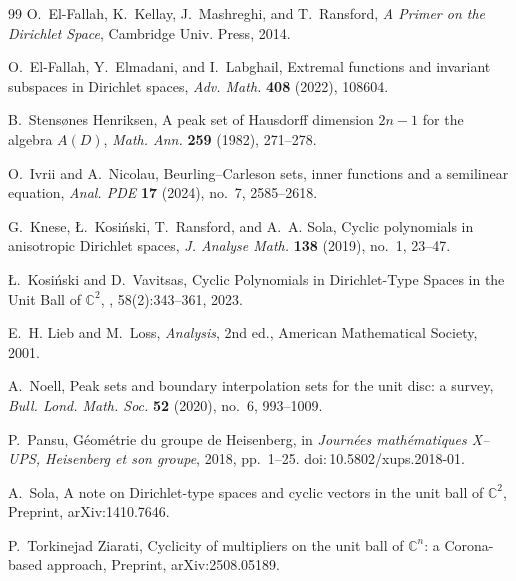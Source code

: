 \documentclass[a4paper,12pt]{amsart}
\theoremstyle{definition}
\theoremstyle{remark}
\begin{document}
\begin{thebibliography}{99}
O.~El-Fallah, K.~Kellay, J.~Mashreghi, and T.~Ransford,
\newblock \emph{A Primer on the {Dirichlet} Space},
\newblock Cambridge Univ. Press, 2014.

O.~El-Fallah, Y.~Elmadani, and I.~Labghail,
\newblock Extremal functions and invariant subspaces in {Dirichlet} spaces,
\newblock \emph{Adv. Math.} \textbf{408} (2022), 108604.

B.~Stensønes Henriksen,
\newblock A peak set of {H}ausdorff dimension $2n-1$ for the algebra $A(D)$,
\newblock \emph{Math. Ann.} \textbf{259} (1982), 271--278.

O.~Ivrii and A.~Nicolau,
\newblock Beurling--{C}arleson sets, inner functions and a semilinear equation,
\newblock \emph{Anal. PDE} \textbf{17} (2024), no.~7, 2585--2618.

G.~Knese, Ł.~Kosiński, T.~Ransford, and A.~A. Sola,
\newblock Cyclic polynomials in anisotropic {Dirichlet} spaces,
\newblock \emph{J. Analyse Math.} \textbf{138} (2019), no.~1, 23--47.

Ł.~Kosiński and D.~Vavitsas,
\newblock Cyclic Polynomials in Dirichlet-Type Spaces in the Unit Ball of \(\mathbb{C}^2\),
, 58(2):343–361, 2023.



E.~H. Lieb and M.~Loss,
\emph{Analysis},
2nd ed.,
American Mathematical Society, 2001.


A.~Noell,
\newblock Peak sets and boundary interpolation sets for the unit disc: a survey,
\newblock \emph{Bull. Lond. Math. Soc.} \textbf{52} (2020), no.~6, 993--1009.

P.~Pansu,
\newblock Géométrie du groupe de Heisenberg,
\newblock in \emph{Journées mathématiques X--UPS, Heisenberg et son groupe},
  2018, pp.~1--25.
\newblock doi:\,10.5802/xups.2018-01.


A.~Sola,
\newblock A note on {Dirichlet}-type spaces and cyclic vectors in the unit ball of $\mathbb{C}^2$,
\newblock Preprint, arXiv:1410.7646.

P.~Torkinejad Ziarati,
\newblock Cyclicity of multipliers on the unit ball of $\mathbb{C}^n$: a {Corona}-based approach,
\newblock Preprint, arXiv:2508.05189.


\end{thebibliography}
\end{document}

